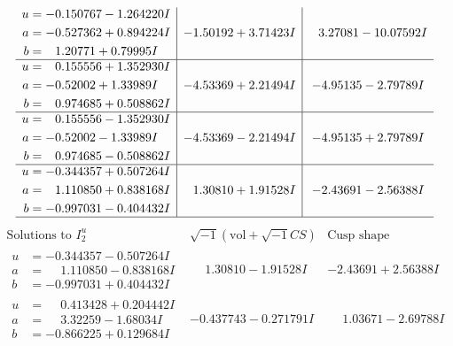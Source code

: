 \documentclass[1p]{elsarticle_modified}
\theoremstyle{definition}
\newcommand{\I}{\sqrt{-1}}
\begin{document}
$$\begin{array}{c|c|c}
\begin{aligned}
u &= -0.150767 - 1.264220 I \\
a &= -0.527362 + 0.894224 I \\
b &= \phantom{-}1.20771 + 0.79995 I\end{aligned}
 & -1.50192 + 3.71423 I & \phantom{-}3.27081 - 10.07592 I \\ \hline\begin{aligned}
u &= \phantom{-}0.155556 + 1.352930 I \\
a &= -0.52002 + 1.33989 I \\
b &= \phantom{-}0.974685 + 0.508862 I\end{aligned}
 & -4.53369 + 2.21494 I & -4.95135 - 2.79789 I \\ \hline\begin{aligned}
u &= \phantom{-}0.155556 - 1.352930 I \\
a &= -0.52002 - 1.33989 I \\
b &= \phantom{-}0.974685 - 0.508862 I\end{aligned}
 & -4.53369 - 2.21494 I & -4.95135 + 2.79789 I \\ \hline\begin{aligned}
u &= -0.344357 + 0.507264 I \\
a &= \phantom{-}1.110850 + 0.838168 I \\
b &= -0.997031 - 0.404432 I\end{aligned}
 & \phantom{-}1.30810 + 1.91528 I & -2.43691 - 2.56388 I\\
 \hline 
 \end{array}$$\newpage$$\begin{array}{c|c|c}  
\text{Solutions to }I^u_{2}& \I (\text{vol} + \sqrt{-1}CS) & \text{Cusp shape}\\
 \hline 
\begin{aligned}
u &= -0.344357 - 0.507264 I \\
a &= \phantom{-}1.110850 - 0.838168 I \\
b &= -0.997031 + 0.404432 I\end{aligned}
 & \phantom{-}1.30810 - 1.91528 I & -2.43691 + 2.56388 I \\ \hline\begin{aligned}
u &= \phantom{-}0.413428 + 0.204442 I \\
a &= \phantom{-}3.32259 - 1.68034 I \\
b &= -0.866225 + 0.129684 I\end{aligned}
 & -0.437743 - 0.271791 I & \phantom{-}1.03671 - 2.69788 I \\ \hline\begin{aligned}

\end{aligned}
\end{array}$$
\end{document}
